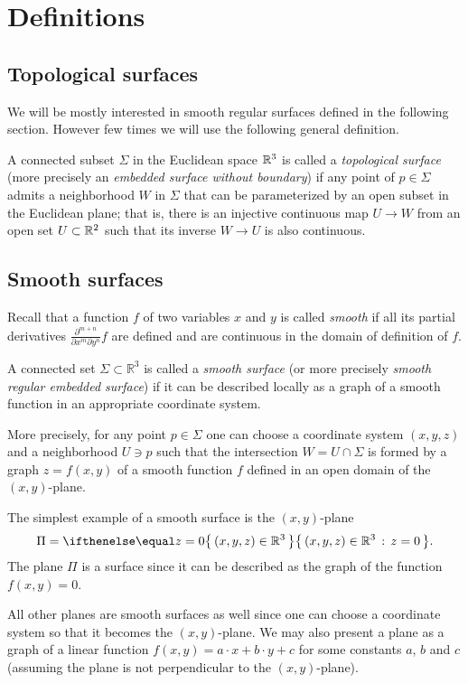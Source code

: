 \chapter{Definitions}

\section*{Topological surfaces}

We will be mostly interested in smooth regular surfaces defined in the following section.
However few times we will use the following general definition.

A connected subset $\Sigma$ in the Euclidean space $\mathbb{R}^3$
is called a \emph{topological surface} (more precisely an \emph{embedded surface without boundary}) 
if any point of $p\in \Sigma$ admits a neighborhood $W$ in $\Sigma$ 
that can be parameterized by an open subset in the Euclidean plane; %
that is, there is an injective continuous map $U\to W$ from an open set $U\subset \mathbb{R}^2$ such that its inverse $W\to U$ is also continuous.


\section*{Smooth surfaces}

Recall that a function $f$ of two variables $x$ and $y$ is called \emph{smooth} if all its partial derivatives $\frac{\partial^{m+n}}{\partial x^m\partial y^n}f$ are defined and are continuous in the domain of definition of $f$. 

A connected set $\Sigma \subset \mathbb{R}^3$ is called a \emph{smooth surface} (or more precisely \emph{smooth regular embedded surface}) if it can be described locally as a graph of a smooth function in an appropriate coordinate system.\label{page:def-smooth-surface} %

More precisely, for any point $p\in \Sigma$ one can choose a coordinate system $(x,y,z)$ and a neighborhood $U\ni p$ such that
the intersection $W=U\cap \Sigma$ is formed by a graph $z=f(x,y)$ of a smooth function $f$ defined in an open domain of the $(x,y)$-plane.

The simplest example of a smooth surface is the $(x,y)$-plane 
\[\Pi=\set{(x,y,z)\in\RR^3}{z=0}.\]
The plane $\Pi$ is a surface since
it can be described as the graph of the function $f(x,y)=0$.

All other planes are smooth surfaces as well since one can choose a coordinate system so that it becomes the $(x,y)$-plane.
We may also present a plane as a graph of a linear function 
$f(x,y)=a\cdot x+b\cdot y+c$ for some constants $a$, $b$ and $c$
(assuming the plane is not perpendicular to the $(x,y)$-plane).

